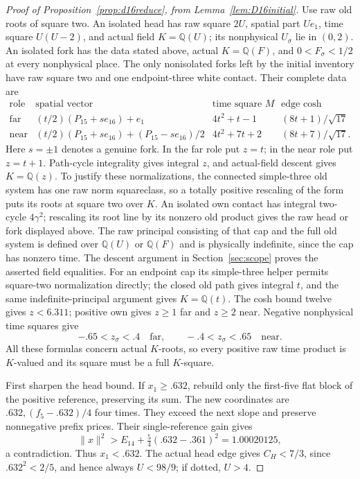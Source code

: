 \documentclass[11pt]{article}
\begin{document}
\begin{proof}[Proof of Proposition~\ref{prop:d16reduce}, from
Lemma~\ref{lem:D16initial}]
Use raw old roots of square two. An isolated head has raw square
$2U$, spatial part $Ue_1$, time square $U(U-2)$, and actual field
$K=\mathbb Q(U)$; its nonphysical $U_\sigma$ lie in $(0,2)$.
An isolated fork has the data stated above, actual $K=\mathbb Q(F)$,
and $0<F_\sigma<1/2$ at every nonphysical place.
The only nonisolated forks left by the initial inventory have raw
square two and one endpoint-three white contact. Their complete data are
\[
\begin{array}{c|c|c|c}
\text{role}&\text{spatial vector}&\text{time square }M&\text{edge cosh}\\\hline
\text{far}&(t/2)(P_{15}+s e_{16})+e_1&4t^2+t-1&(8t+1)/\sqrt{17}\\
\text{near}&(t/2)(P_{15}+s e_{16})+(P_{15}-s e_{16})/2
 &4t^2+7t+2&(8t+7)/\sqrt{17}.
\end{array}
\]
Here $s=\pm1$ denotes a genuine fork. In the far role put $z=t$;
in the near role put $z=t+1$. Path-cycle integrality gives integral
$z$, and actual-field descent gives $K=\mathbb Q(z)$.
To justify these normalizations, the connected simple-three old system
has one raw norm squareclass, so a totally positive rescaling of the
form puts its roots at square two over $K$. An isolated own contact
has integral two-cycle $4\gamma^2$; rescaling its root line by its
nonzero old product gives the raw head or fork displayed above.
The raw principal consisting of that cap and the full old system is
defined over $\mathbb Q(U)$ or $\mathbb Q(F)$ and is physically
indefinite, since the cap has nonzero time. The descent argument in
Section~\ref{sec:scope} proves the asserted field equalities.
For an endpoint cap its simple-three helper permits square-two
normalization directly; the closed old path gives integral $t$,
and the same indefinite-principal argument gives $K=\mathbb Q(t)$.
The cosh bound twelve gives $z<6.311$; positive own gives
$z\ge1$ far and $z\ge2$ near. Negative nonphysical time squares give
\begin{equation}\label{eq:D16endpointstrips}
 -.65<z_\sigma<.4\quad\text{far},\qquad
 -.4<z_\sigma<.65\quad\text{near}.
\end{equation}
All these formulas concern actual $K$-roots, so every positive raw
time product is $K$-valued and its square must be a full $K$-square.

First sharpen the head bound. If $x_1\ge.632$, rebuild only the
first-five flat block of the positive reference, preserving its sum.
The new coordinates are $.632,(f_5-.632)/4$ four times.
They exceed the next slope and preserve nonnegative prefix prices.
Their single-reference gain gives
\[
 \|x\|^2>E_{14}+\tfrac54(.632-.361)^2=1.00020125,
\]
a contradiction. Thus $x_1<.632$. The actual head edge gives
$C_H<7/3$, since $.632^2<2/5$, and hence always $U<98/9$;
if dotted, $U>4$.


\end{proof}
\end{document}
